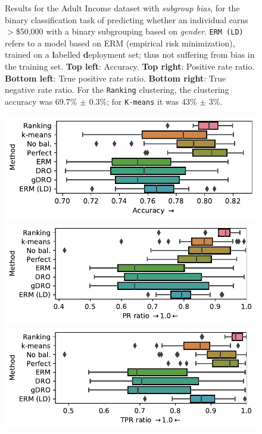 \begin{figure}[p]
    \caption{%
    Results for the Adult Income dataset with \emph{subgroup bias},
    for the binary classification task of predicting whether an individual earns $>$\$50,000 with a binary subgrouping based on \emph{gender}.
    \texttt{ERM (LD)} refers to a model based on ERM (empirical risk minimization),
    trained on a \textbf{l}abelled \textbf{d}eployment set; thus not suffering from bias in the training set.
    \textbf{Top left}: Accuracy.
    \textbf{Top right}: Positive rate ratio.
    \textbf{Bottom left}: True positive rate ratio.
    \textbf{Bottom right}: True negative rate ratio.
    For the \texttt{Ranking} clustering, the clustering accuracy was 69.7\% $\pm$ 0.3\%;
    for \texttt{K-means} it was 43\% $\pm$ 3\%.
    }%
    \label{fig:adult-subgroup-bias}
\end{figure}
\begin{figure}[p]
    \centering
    \includegraphics[width=\columnwidth]{figures/adult_miss_s_acc.pdf}
    \includegraphics[width=\columnwidth]{figures/adult_miss_s_prr.pdf}
    \includegraphics[width=\columnwidth]{figures/adult_miss_s_tprr.pdf}

\end{figure}
